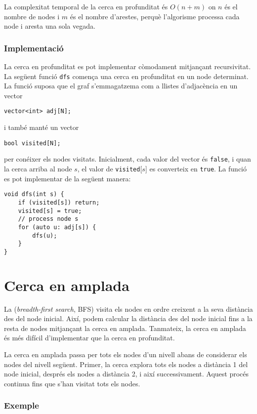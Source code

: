 La complexitat temporal de la cerca en profunditat és $O(n+m)$ on $n$
és el nombre de nodes i $m$ és el nombre d'arestes, perquè l'algorisme
processa cada node i aresta una sola vegada.

\subsubsection*{Implementació}

La cerca en profunditat es pot implementar còmodament mitjançant
recursivitat. La següent funció \texttt{dfs} comença una cerca en
profunditat en un node determinat. La funció suposa que el graf
s'emmagatzema com a llistes d'adjacència en un vector
\begin{lstlisting}
vector<int> adj[N];
\end{lstlisting}
i també manté un vector
\begin{lstlisting}
bool visited[N];
\end{lstlisting}
per conéixer els nodes visitats. Inicialment, cada valor del vector és
\texttt{false}, i quan la cerca arriba al node $s$, el valor de
\texttt{visited}[$s$] es converteix en \texttt{true}. La funció es pot
implementar de la següent manera:
\begin{lstlisting}
void dfs(int s) {
    if (visited[s]) return;
    visited[s] = true;
    // process node s
    for (auto u: adj[s]) {
        dfs(u);
    }
}
\end{lstlisting}


\section{Cerca en amplada}


La  (\emph{breadth-first search}, BFS) visita
els nodes en ordre creixent a la seva distància des del node
inicial. Així, podem calcular la distància des del node inicial fins a
la resta de nodes mitjançant la cerca en amplada. Tanmateix, la cerca
en amplada és més difícil d'implementar que la cerca en profunditat.

La cerca en amplada passa per tots els nodes d'un nivell abans de
considerar els nodes del nivell següent. Primer, la cerca explora tots
els nodes a distància 1 del node inicial, després els nodes a
distància 2, i així successivament. Aquest procés continua fins que
s'han visitat tots els nodes.

\subsubsection*{Exemple}


